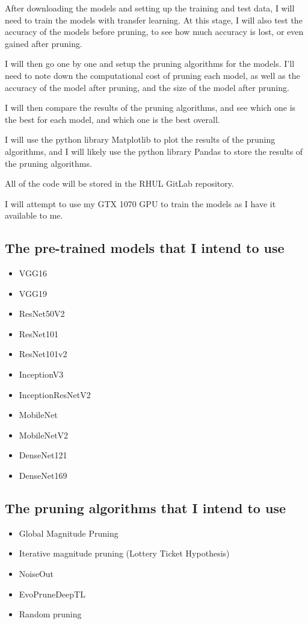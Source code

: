 \documentclass{article}
\begin{document}
After downloading the models and setting up the training and test data, I will need to
train the models with transfer learning. At this stage, I will also test the accuracy of the
models before pruning, to see how much accuracy is lost, or even gained after pruning.

I will then go one by one and setup the pruning algorithms for the models.
I'll need to note down the computational cost of pruning each model, as well as the
accuracy of the model after pruning, and the size of the model after pruning.

I will then compare the results of the pruning algorithms, and see which one is the best
for each model, and which one is the best overall.

I will use the python library Matplotlib\cite{Matplotlib} to plot the results of the pruning algorithms,
and I will likely use the python library Pandas\cite{Pandas} to store the results of the pruning algorithms.

All of the code will be stored in the RHUL GitLab\cite{RHULGitLab} repository.

I will attempt to use my GTX 1070 GPU\cite{GTX1070} to train the models as I have it available to me.



\pagebreak

\subsection{The pre-trained models that I intend to use}
\begin{itemize}
	\item VGG16
	\item VGG19
	\item ResNet50V2
	\item ResNet101
	\item ResNet101v2
	\item InceptionV3
	\item InceptionResNetV2
	\item MobileNet
	\item MobileNetV2
	\item DenseNet121
	\item DenseNet169
\end{itemize}

\subsection{The pruning algorithms that I intend to use}
\begin{itemize}
	\item Global Magnitude Pruning \cite{gupta2022global}
	\item Iterative magnitude pruning (Lottery Ticket Hypothesis)\cite{LotteryTicket}
	\item NoiseOut\cite{DBLP:journals/corr/BabaeizadehSC16}
	\item EvoPruneDeepTL \cite{DBLP:journals/corr/abs-2202-03844}
	\item Random pruning
\end{itemize}
\end{document}
